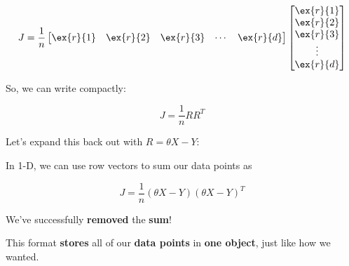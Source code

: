         \begin{equation}
            J = 
            \frac{1}{n}
            \begin{bmatrix}
              \ex{r}{1} & \ex{r}{2} & \ex{r}{3} & \cdots & \ex{r}{d}
            \end{bmatrix}
            \begin{bmatrix}
              \ex{r}{1} \\ \ex{r}{2} \\ \ex{r}{3} \\ \vdots \\ \ex{r}{d}
            \end{bmatrix}
        \end{equation}
        
        So, we can write compactly:
        
        \begin{equation}
            J = \frac{1}{n} RR^T
        \end{equation}
        
        Let's expand this back out with $R = \theta X - Y$:\\
        
        \begin{concept}
            In 1-D, we can use row vectors to sum our data points as
            
            \begin{equation*}
                J = \frac{1}{n} (\theta X - Y)(\theta X - Y)^T
            \end{equation*}
        \end{concept}
        
        We've successfully \textbf{removed} the \textbf{sum}!
        
        This format \textbf{stores} all of our \textbf{data points} in \textbf{one object}, just like how we wanted.
        